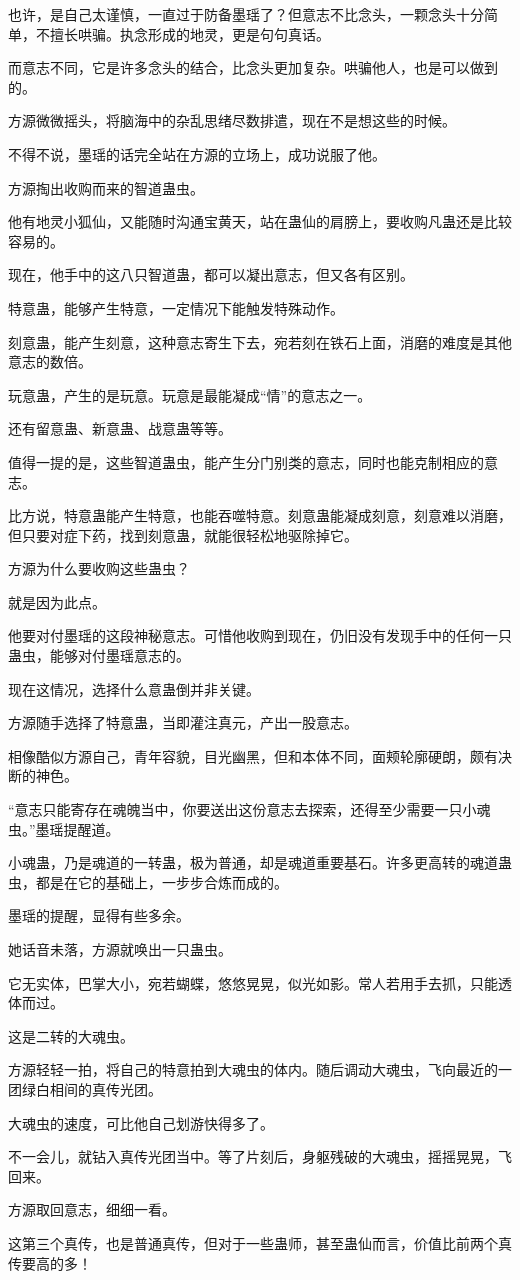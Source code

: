 \begin{this_body}
也许，是自己太谨慎，一直过于防备墨瑶了？但意志不比念头，一颗念头十分简单，不擅长哄骗。执念形成的地灵，更是句句真话。

而意志不同，它是许多念头的结合，比念头更加复杂。哄骗他人，也是可以做到的。

方源微微摇头，将脑海中的杂乱思绪尽数排遣，现在不是想这些的时候。

不得不说，墨瑶的话完全站在方源的立场上，成功说服了他。

方源掏出收购而来的智道蛊虫。

他有地灵小狐仙，又能随时沟通宝黄天，站在蛊仙的肩膀上，要收购凡蛊还是比较容易的。

现在，他手中的这八只智道蛊，都可以凝出意志，但又各有区别。

特意蛊，能够产生特意，一定情况下能触发特殊动作。

刻意蛊，能产生刻意，这种意志寄生下去，宛若刻在铁石上面，消磨的难度是其他意志的数倍。

玩意蛊，产生的是玩意。玩意是最能凝成“情”的意志之一。

还有留意蛊、新意蛊、战意蛊等等。

值得一提的是，这些智道蛊虫，能产生分门别类的意志，同时也能克制相应的意志。

比方说，特意蛊能产生特意，也能吞噬特意。刻意蛊能凝成刻意，刻意难以消磨，但只要对症下药，找到刻意蛊，就能很轻松地驱除掉它。

方源为什么要收购这些蛊虫？

就是因为此点。

他要对付墨瑶的这段神秘意志。可惜他收购到现在，仍旧没有发现手中的任何一只蛊虫，能够对付墨瑶意志的。

现在这情况，选择什么意蛊倒并非关键。

方源随手选择了特意蛊，当即灌注真元，产出一股意志。

相像酷似方源自己，青年容貌，目光幽黑，但和本体不同，面颊轮廓硬朗，颇有决断的神色。

“意志只能寄存在魂魄当中，你要送出这份意志去探索，还得至少需要一只小魂虫。”墨瑶提醒道。

小魂蛊，乃是魂道的一转蛊，极为普通，却是魂道重要基石。许多更高转的魂道蛊虫，都是在它的基础上，一步步合炼而成的。

墨瑶的提醒，显得有些多余。

她话音未落，方源就唤出一只蛊虫。

它无实体，巴掌大小，宛若蝴蝶，悠悠晃晃，似光如影。常人若用手去抓，只能透体而过。

这是二转的大魂虫。

方源轻轻一拍，将自己的特意拍到大魂虫的体内。随后调动大魂虫，飞向最近的一团绿白相间的真传光团。

大魂虫的速度，可比他自己划游快得多了。

不一会儿，就钻入真传光团当中。等了片刻后，身躯残破的大魂虫，摇摇晃晃，飞回来。

方源取回意志，细细一看。

这第三个真传，也是普通真传，但对于一些蛊师，甚至蛊仙而言，价值比前两个真传要高的多！

\end{this_body}

